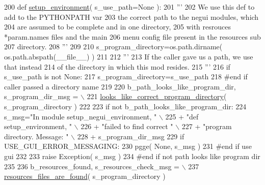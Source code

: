 \begin{DoxyCode}
200 \textcolor{keyword}{def }\hyperlink{namespacenegui_1_1setup__negui__environment_a22a2451db03931ad081654ab38ad0469}{setup\_environment}( s\_use\_path=None ):
201     \textcolor{stringliteral}{'''}
202 \textcolor{stringliteral}{    We use this def to add to the PYTHONPATH var}
203 \textcolor{stringliteral}{    the correct path to the negui modules, which }
204 \textcolor{stringliteral}{    are assumed to be complete and in one directory,}
205 \textcolor{stringliteral}{    with resrouces *param.names files and the main}
206 \textcolor{stringliteral}{    menu config file present in the resources sub}
207 \textcolor{stringliteral}{    directory.}
208 \textcolor{stringliteral}{    '''}
209 
210     s\_program\_directory=os.path.dirname( os.path.abspath(\_\_file\_\_) )
211 
212     \textcolor{stringliteral}{'''}
213 \textcolor{stringliteral}{    If the caller gave us a path, we use that instead}
214 \textcolor{stringliteral}{    of the directory in which this mod resides.}
215 \textcolor{stringliteral}{    '''}
216     \textcolor{keywordflow}{if} s\_use\_path \textcolor{keywordflow}{is} \textcolor{keywordflow}{not} \textcolor{keywordtype}{None}:
217         s\_program\_directory=s\_use\_path
218     \textcolor{comment}{#end if caller passed a directory name}
219 
220     b\_path\_looks\_like\_program\_dir, s\_program\_dir\_msg = \(\backslash\)
221             \hyperlink{namespacenegui_1_1setup__negui__environment_a3dc373e848bd3191a1850e9885990e55}{looks\_like\_correct\_program\_directory}( s\_program\_directory )
222 
223     \textcolor{keywordflow}{if} \textcolor{keywordflow}{not} b\_path\_looks\_like\_program\_dir:
224         s\_msg=\textcolor{stringliteral}{"In module setup\_negui\_environment, "} \(\backslash\)
225                         + \textcolor{stringliteral}{"def setup\_environment, "} \(\backslash\)
226                         + \textcolor{stringliteral}{"failed to find correct "} \(\backslash\)
227                         + \textcolor{stringliteral}{"program directory.  Message: "} \(\backslash\)
228                         + s\_program\_dir\_msg 
229         \textcolor{keywordflow}{if} USE\_GUI\_ERROR\_MESSAGING:
230             pgge( \textcolor{keywordtype}{None}, s\_msg )
231         \textcolor{comment}{#end if use gui}
232 
233         \textcolor{keywordflow}{raise} Exception( s\_msg )
234     \textcolor{comment}{#end if not path looks like program dir}
235 
236     b\_resources\_found, s\_resources\_check\_msg = \(\backslash\)
237             \hyperlink{namespacenegui_1_1setup__negui__environment_a6fe75d5a25f049e0922770c01800bf0f}{resources\_files\_are\_found}( s\_program\_directory )

\end{DoxyCode}
